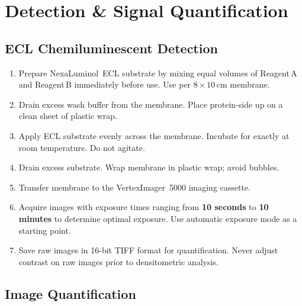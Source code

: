 
\section{Detection \& Signal Quantification}

\subsection{ECL Chemiluminescent Detection}

\begin{enumerate}
  \item Prepare NexaLuminol\texttrademark~ECL substrate by mixing equal volumes of
        Reagent\,A and Reagent\,B immediately before use. Use  per
        $8 \times 10$\,cm membrane.
  \item Drain excess wash buffer from the membrane. Place protein-side up on a
        clean sheet of plastic wrap.
  \item Apply ECL substrate evenly across the membrane. Incubate for exactly
         at room temperature. Do not agitate.
  \item Drain excess substrate. Wrap membrane in plastic wrap; avoid bubbles.
  \item Transfer membrane to the VertexImager\texttrademark~5000 imaging cassette.
  \item Acquire images with exposure times ranging from \textbf{10 seconds} to
        \textbf{10 minutes} to determine optimal exposure. Use automatic exposure
        mode as a starting point.
  \item Save raw images in 16-bit TIFF format for quantification. Never adjust
        contrast on raw images prior to densitometric analysis.
\end{enumerate}

\subsection{Image Quantification}

